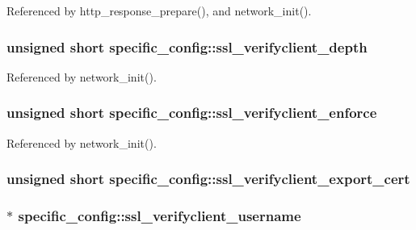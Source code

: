 Referenced by http\-\_\-response\-\_\-prepare(), and network\-\_\-init().

\hypertarget{structspecific__config_a37061028773171cbd1044b641b4c057c}{
\subsubsection[{ssl\-\_\-verifyclient\-\_\-depth}]{\setlength{\rightskip}{0pt plus 5cm}unsigned short specific\-\_\-config\-::ssl\-\_\-verifyclient\-\_\-depth}}\label{structspecific__config_a37061028773171cbd1044b641b4c057c}


Referenced by network\-\_\-init().

\hypertarget{structspecific__config_a34e09eb071c50962e7a0d33017e69969}{
\subsubsection[{ssl\-\_\-verifyclient\-\_\-enforce}]{\setlength{\rightskip}{0pt plus 5cm}unsigned short specific\-\_\-config\-::ssl\-\_\-verifyclient\-\_\-enforce}}\label{structspecific__config_a34e09eb071c50962e7a0d33017e69969}


Referenced by network\-\_\-init().

\hypertarget{structspecific__config_a944ab1b079871adfa33aad8ac9f6a5e2}{
\subsubsection[{ssl\-\_\-verifyclient\-\_\-export\-\_\-cert}]{\setlength{\rightskip}{0pt plus 5cm}unsigned short specific\-\_\-config\-::ssl\-\_\-verifyclient\-\_\-export\-\_\-cert}}\label{structspecific__config_a944ab1b079871adfa33aad8ac9f6a5e2}
\hypertarget{structspecific__config_ac782e8a76d804008bdbc879de4be7a67}{
\subsubsection[{ssl\-\_\-verifyclient\-\_\-username}]{$\ast$ specific\-\_\-config\-::ssl\-\_\-verifyclient\-\_\-username}}\label{structspecific__config_ac782e8a76d804008bdbc879de4be7a67}


